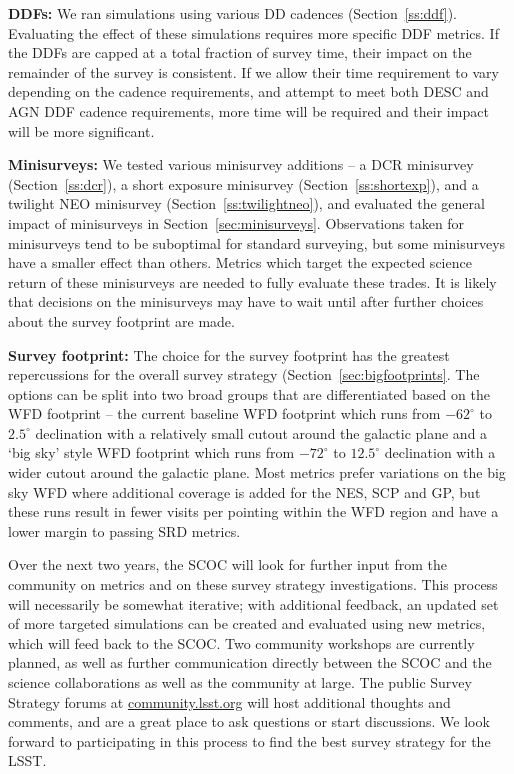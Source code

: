 {\bf DDFs:} We ran simulations using various DD cadences (Section~\ref{ss:ddf}). Evaluating the effect of these simulations requires more specific DDF metrics. If the DDFs are capped at a total fraction of survey time, their impact on the remainder of the survey is consistent. If we allow their time requirement to vary depending on the cadence requirements, and attempt to meet both DESC and AGN DDF cadence requirements, more time will be required and their impact will be more significant.

{\bf Minisurveys:} We tested various minisurvey additions -- a DCR minisurvey (Section~\ref{ss:dcr}), a short exposure minisurvey (Section~\ref{ss:shortexp}), and a twilight NEO minisurvey (Section~\ref{ss:twilightneo}), and evaluated the general impact of minisurveys in Section~\ref{sec:minisurveys}. Observations taken for minisurveys tend to be suboptimal for standard surveying, but some minisurveys have a smaller effect than others. Metrics which target the expected science return of these minisurveys are needed to fully evaluate these trades. It is likely that decisions on the minisurveys may have to wait until after further choices about the survey footprint are made.

{\bf Survey footprint:} The choice for the survey footprint has the greatest repercussions for the overall survey strategy (Section~\ref{sec:bigfootprints}. The options can be split into two broad groups that are differentiated based on the WFD footprint -- the current baseline WFD footprint which runs from $-62^\circ$ to $2.5^\circ$ declination with a relatively small cutout around the galactic plane and a `big sky' style WFD footprint which runs from  $-72^\circ$ to $12.5^\circ$ declination with a wider cutout around the galactic plane. Most metrics prefer variations on the big sky WFD where additional coverage is added for the NES, SCP and GP, but these runs result in fewer visits per pointing within the WFD region and have a lower margin to passing SRD metrics. 

Over the next two years, the SCOC will look for further input from the community on metrics and on these survey strategy investigations. This process will necessarily be somewhat iterative; with additional feedback, an updated set of more targeted simulations can be created and evaluated using new metrics, which will feed back to the SCOC. Two community workshops are currently planned, as well as further communication directly between the SCOC and the science collaborations as well as the community at large. The public Survey Strategy forums at \href{https://community.lsst.org/c/sci/survey-strategy}{community.lsst.org} will host additional thoughts and comments, and are a great place to ask questions or start discussions. We look forward to participating in this process to find the best survey strategy for the LSST.

